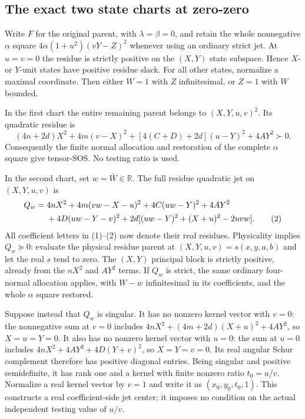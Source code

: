 \subsection*{The exact two state charts at zero-zero}

Write $F$ for the original parent, with $\lambda=\beta=0$, and retain
the whole nonnegative $\alpha$ square
$4\alpha(1+u^2)(vY-Z)^2$ whenever using an ordinary strict jet.
At $u=v=0$ the residue is strictly positive on the $(X,Y)$ state
subspace. Hence $X$- or $Y$-unit states have positive residue slack.
For all other states, normalize a maximal coordinate. Then either
$W=1$ with $Z$ infinitesimal, or $Z=1$ with $W$ bounded.

In the first chart the entire remaining parent belongs to
$(X,Y,u,v)^2$. Its quadratic residue is
\begin{equation}
 (4n+2d)X^2+4m(v-X)^2+[4(C+D)+2d](u-Y)^2+4AY^2\succ0. \tag{1}
\end{equation}
Consequently the finite normal allocation and restoration of the
complete $\alpha$ square give tensor-SOS. No testing ratio is used.

In the second chart, set $w=\bar W\in\mathbb R$. The full residue
quadratic jet on $(X,Y,u,v)$ is
\begin{align}
 Q_w={}&4nX^2+4m(vw-X-u)^2+4C(uw-Y)^2+4AY^2\notag\\
      &+4D(uw-Y-v)^2
        +2d[(uw-Y)^2+(X+u)^2-2uvw].                    \tag{2}
\end{align}
All coefficient letters in (1)--(2) now denote their real residues.
Physicality implies $Q_w\succeq0$: evaluate the physical residue
parent at $(X,Y,u,v)=s(x,y,a,b)$ and let the real $s$ tend to zero.
The $(X,Y)$ principal block is strictly positive, already from the
$nX^2$ and $AY^2$ terms. If $Q_w$ is strict, the same ordinary
four-normal allocation applies, with $W-w$ infinitesimal in its
coefficients, and the whole $\alpha$ square restored.

Suppose instead that $Q_w$ is singular. It has no nonzero kernel
vector with $v=0$: the nonnegative sum at $v=0$ includes
$4nX^2+(4m+2d)(X+u)^2+4AY^2$, so $X=u=Y=0$.
It also has no nonzero kernel vector with $u=0$: the sum at $u=0$
includes $4nX^2+4AY^2+4D(Y+v)^2$, so $X=Y=v=0$.
Its real angular Schur complement therefore has positive diagonal
entries. Being singular and positive semidefinite, it has rank one
and a kernel with finite nonzero ratio $t_0=u/v$. Normalize a real
kernel vector by $v=1$ and write it as $(x_0,y_0,t_0,1)$.
This constructs a real coefficient-side jet center; it imposes no
condition on the actual independent testing value of $u/v$.

